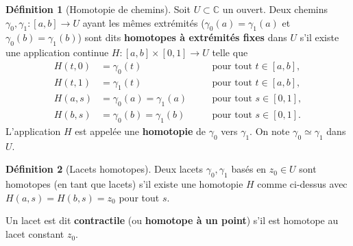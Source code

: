 \documentclass[12pt,a4paper,openany]{book}
\theoremstyle{definition}
\newtheorem{definition}{Définition}[chapter]
\theoremstyle{plain}
\theoremstyle{remark}
\newcommand{\C}{\mathbb{C}}
\begin{document}
\begin{definition}[Homotopie de chemins]\label{def:homotopie}
Soit $U \subset \C$ un ouvert. Deux chemins $\gamma_0, \gamma_1 \colon
[a,b] \to U$ ayant les mêmes extrémités ($\gamma_0(a) = \gamma_1(a)$ et
$\gamma_0(b) = \gamma_1(b)$) sont dits \textbf{homotopes à extrémités
fixes} dans $U$ s'il existe une application continue
$H \colon [a,b] \times [0,1] \to U$ telle que
\begin{align*}
  H(t,0) &= \gamma_0(t) \quad &&\text{pour tout } t \in [a,b], \\
  H(t,1) &= \gamma_1(t) \quad &&\text{pour tout } t \in [a,b], \\
  H(a,s) &= \gamma_0(a) = \gamma_1(a) \quad &&\text{pour tout } s \in [0,1], \\
  H(b,s) &= \gamma_0(b) = \gamma_1(b) \quad &&\text{pour tout } s \in [0,1].
\end{align*}
L'application $H$ est appelée une \textbf{homotopie} de $\gamma_0$ vers
$\gamma_1$. On note $\gamma_0 \simeq \gamma_1$ dans $U$.
\end{definition}

\begin{definition}[Lacets homotopes]\label{def:lacets-homotopes}
Deux lacets $\gamma_0, \gamma_1$ basés en $z_0 \in U$ sont homotopes (en
tant que lacets) s'il existe une homotopie $H$ comme ci-dessus avec
$H(a,s) = H(b,s) = z_0$ pour tout $s$.

Un lacet est dit \textbf{contractile} (ou
\textbf{homotope à un point}) s'il est homotope au lacet constant $z_0$.
\end{definition}
\end{document}
